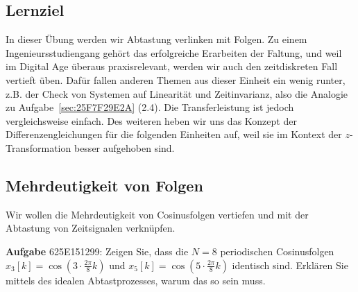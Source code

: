 \subsection*{Lernziel}
In dieser Übung werden wir Abtastung verlinken mit Folgen.
Zu einem Ingenieursstudiengang gehört das erfolgreiche Erarbeiten
der Faltung, und weil im Digital Age überaus praxisrelevant,
werden wir auch den zeitdiskreten Fall vertieft üben.
Dafür fallen anderen Themen aus dieser Einheit ein wenig runter, z.B.
der Check von Systemen auf Linearität und Zeitinvarianz, also die Analogie zu
Aufgabe~\ref{sec:25F7F29E2A} (2.4). Die Transferleistung ist jedoch vergleichsweise einfach.
Des weiteren heben wir uns das Konzept der Differenzengleichungen für die folgenden
Einheiten auf, weil sie im Kontext der $z$-Transformation besser aufgehoben sind.


\newpage
\subsection{Mehrdeutigkeit von Folgen}
\label{sec:625E151299}
\begin{Ziel}
Wir wollen die Mehrdeutigkeit von Cosinusfolgen vertiefen und mit
der Abtastung von Zeitsignalen verknüpfen.
\end{Ziel}
\textbf{Aufgabe} {\tiny 625E151299}: Zeigen Sie, dass die $N=8$ periodischen
Cosinusfolgen $x_3[k] = \cos(3\cdot\frac{2\pi}{8}k)$ und
$x_5[k] = \cos(5\cdot\frac{2\pi}{8}k)$
identisch sind.
%
Erklären Sie mittels des idealen Abtastprozesses, warum das so sein muss.
%
\begin{center}
\end{center}

